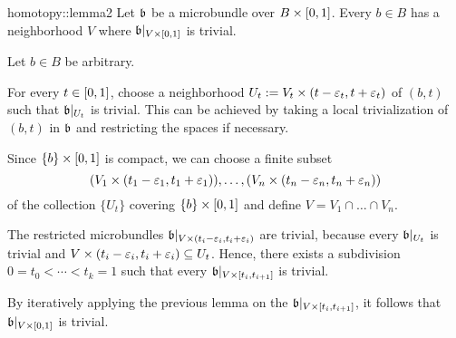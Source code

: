\begin{mylemma}{homotopy::lemma2}
    Let $\mathfrak{b}$ be a microbundle over $B \times{} [0, 1]$.
    Every $b \in B$ has a neighborhood $V$ where $\mathfrak{b}\vert_{V \times{} [0, 1]}$ is trivial.
\end{mylemma}

\begin{myproof}
    Let $b \in B$ be arbitrary.

    For every $t \in [0, 1]$, choose a neighborhood $U_t := V_t \times (t - \varepsilon{}_t, t + \varepsilon{}_t)$ of $(b, t)$ such that $\mathfrak{b}\vert_{U_t}$ is trivial.
    This can be achieved by taking a local trivialization of $(b, t)$ in $\mathfrak{b}$ and restricting the spaces if necessary.

    Since $\{b\} \times{} [0, 1]$ is compact, we can choose a finite subset
    \[ (V_1 \times (t_1 - \varepsilon{}_1, t_1 + \varepsilon{}_1)), \dots, (V_n \times (t_n - \varepsilon{}_n, t_n + \varepsilon{}_n)) \]
    of the collection $\{U_t\}$ covering $\{b\} \times [0, 1]$ and define $V = V_1 \cap \dots \cap V_n$.

    The restricted microbundles $\mathfrak{b}\vert_{V \times (t_i - \varepsilon{}_i, t_i + \varepsilon{}_i)}$ are trivial, because every $\mathfrak{b}\vert_{U_t}$ is trivial and $V \times (t_i - \varepsilon{}_i, t_i + \varepsilon{}_i) \subseteq{} U_t$.
    Hence, there exists a subdivision $0 = t_0 < \cdots < t_k = 1$ such that every $\mathfrak{b}\vert_{V \times [t_{i}, t_{i + 1}]}$ is trivial.
    
    By iteratively applying the previous lemma on the $\mathfrak{b}\vert_{V \times [t_i, t_{i + 1}]}$, it follows that $\mathfrak{b}\vert_{V \times{} [0, 1]}$ is trivial.
\end{myproof}